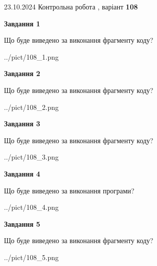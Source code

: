 \documentclass[12pt, ukrainian]{article}
\begin{document}
{\Large{23.10.2024 Контрольна робота , варіант  \No \textbf { 108 }\par}}
{
\begin {large}
{\begin {center}\textbf{Завдання 1}\end {center}}

Що буде виведено за виконання фрагменту коду?\par
\begin{center}
	{../pict/108_1.png}
\end{center}
\newpage

{\begin {center}\textbf{Завдання 2}\end {center}}

Що буде виведено за виконання фрагменту коду?\par
\begin{center}
	{../pict/108_2.png}
\end{center}
\newpage

{\begin {center}\textbf{Завдання 3}\end {center}}

Що буде виведено за виконання фрагменту коду?\par
\begin{center}
	{../pict/108_3.png}
\end{center}
\newpage

{\begin {center}\textbf{Завдання 4}\end {center}}

Що буде виведено за виконання програми?\par
\begin{center}
	{../pict/108_4.png}
\end{center}
\newpage

{\begin {center}\textbf{Завдання 5}\end {center}}

Що буде виведено за виконання фрагменту коду?\par
\begin{center}
	{../pict/108_5.png}
\end{center}
\newpage


\end{large}}
\end{document}
